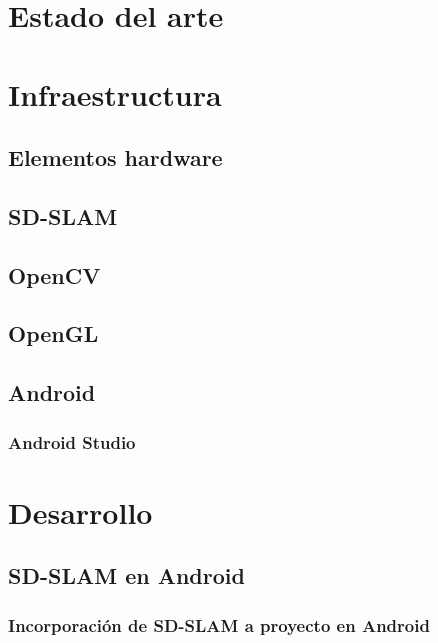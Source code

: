 \documentclass[a4paper, 12pt]{book}
\begin{document}
\chapter{Estado del arte} %
\label{sec:estadodelarte}

\chapter{Infraestructura}
\label{sec:infraestructura}

\section{Elementos hardware}
\label{sec:elementoshardware}

\section{SD-SLAM}
\label{sec:sdslam}

\section{OpenCV}
\label{sec:opencv}

\section{OpenGL}
\label{sec:opengl}

\section{Android}
\label{sec:android}

\subsection{Android Studio}
\label{subsec:androidstudio}

\chapter{Desarrollo}
\label{sec:desarrollo}

\section{SD-SLAM en Android}
\label{sec:sdslamenandroid}

\subsection{Incorporación de SD-SLAM a proyecto en Android}
\label{subsec:sdslamincorporadoandroid}
\end{document}
